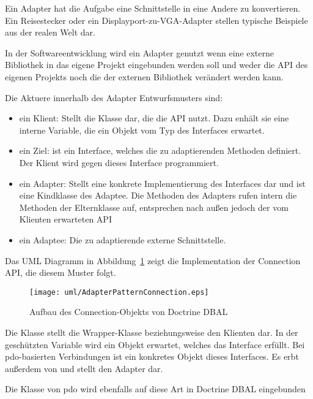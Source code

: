 Ein Adapter hat die Aufgabe eine Schnittstelle in eine Andere zu konvertieren. Ein Reisestecker oder ein Displayport-zu-VGA-Adapter stellen typische Beispiele aus der realen Welt dar.

In der Softwareentwicklung wird ein Adapter genutzt wenn eine externe Bibliothek in das eigene Projekt eingebunden werden soll und weder die API des eigenen Projekts noch die der externen Bibliothek verändert werden kann.

Die Aktuere innerhalb des Adapter Entwurfsmusters sind:

\begin{itemize}
	\item ein Klient: Stellt die Klasse dar, die die API nutzt. Dazu enhält sie eine interne Variable, die ein Objekt vom Typ des Interfaces erwartet.
	\item ein Ziel: ist ein Interface, welches die zu adaptierenden Methoden definiert. Der Klient wird gegen dieses Interface programmiert.
	\item ein Adapter: Stellt eine konkrete Implementierung des Interfaces dar und ist eine Kindklasse des Adaptee. Die Methoden des Adapters rufen intern die Methoden der Elternklasse auf, entsprechen nach außen jedoch der vom Klienten erwarteten API
	\item ein Adaptee: Die zu adaptierende externe Schnittstelle.
\end{itemize}


Das UML Diagramm in Abbildung~\ref{fig:adapterPatternConnection} zeigt die Implementation der Connection API, die diesem Muster folgt.

\begin{figure}[H]
	\centering
	\texttt{[image: uml/AdapterPatternConnection.eps]}
	\caption{Aufbau des Connection-Objekts von Doctrine DBAL}
	\label{fig:adapterPatternConnection}
\end{figure}

Die Klasse  stellt die Wrapper-Klasse beziehungsweise den Klienten dar. In der geschützten Variable  wird ein Objekt erwartet, welches das Interface  erfüllt. Bei \gls{pdo}-basierten Verbindungen ist  ein konkretes Objekt dieses Interfaces. Es erbt außerdem von  und stellt den Adapter dar.

Die Klasse  von \gls{pdo} wird ebenfalls auf diese Art in Doctrine DBAL eingebunden

